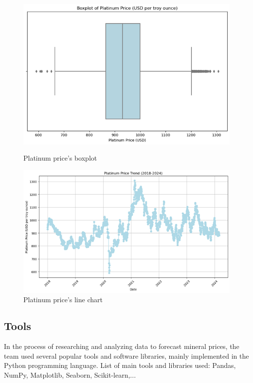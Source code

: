 \documentclass{ieeeojies}
\begin{document}
\begin{figure}[H]
    \centering
    \begin{minipage}{0.23\textwidth}
    \centering
    \includegraphics[width=1\textwidth]{bibliography/Figure/boxplot_pt.png}
    \caption{Platinum price's boxplot}
    \label{fig:1}
    \end{minipage}
    \hfill
    \begin{minipage}{0.23\textwidth}
    \centering
    \includegraphics[width=1\textwidth]{bibliography/Figure/line_pt.png}
    \caption{Platinum price's line chart}
    \label{fig:2}
    \end{minipage}
\end{figure}
\subsection{Tools}
In the process of researching and analyzing data to forecast mineral prices, the team used several popular tools and software libraries, mainly implemented in the Python programming language. List of main tools and libraries used: Pandas, NumPy, Matplotlib, Seaborn, Scikit-learn,...
\end{document}
